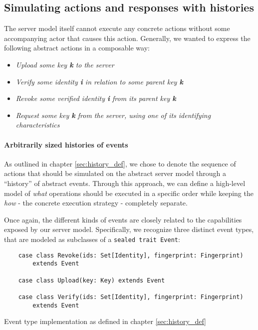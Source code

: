 \subsection{Simulating actions and responses with histories}
The server model itself cannot execute any concrete actions without some accompanying actor that causes this action. Generally, we wanted to express the following abstract actions in a composable way: 
\begin{itemize}
    \item \emph{Upload some key \textbf{k} to the server}
    \item \emph{Verify some identity \textbf{i} in relation to some parent key \textbf{k}}
    \item \emph{Revoke some verified identity \textbf{i} from its parent key \textbf{k}}
    \item \emph{Request some key \textbf{k} from the server, using one of its identifying characteristics}
\end{itemize}

\paragraph{Arbitrarily sized histories of events}
As outlined in chapter \ref{sec:history_def}, we chose to denote the sequence of actions that should be simulated on the abstract server model through a ``history'' of abstract events.
Through this approach, we can define a high-level model of \emph{what} operations should be executed in a specific order while keeping the \emph{how} - the concrete execution strategy - completely separate.

Once again, the different kinds of events are closely related to the capabilities exposed by our server model. Specifically, we recognize three distinct event types, that are modeled as subclasses of a \texttt{sealed trait Event}: 
\begin{code}
    \begin{verbatim}
    case class Revoke(ids: Set[Identity], fingerprint: Fingerprint) 
        extends Event
    
    case class Upload(key: Key) extends Event
    
    case class Verify(ids: Set[Identity], fingerprint: Fingerprint) 
        extends Event
    \end{verbatim}
    \caption{Event type implementation as defined in chapter \ref{sec:history_def}}
\end{code}

